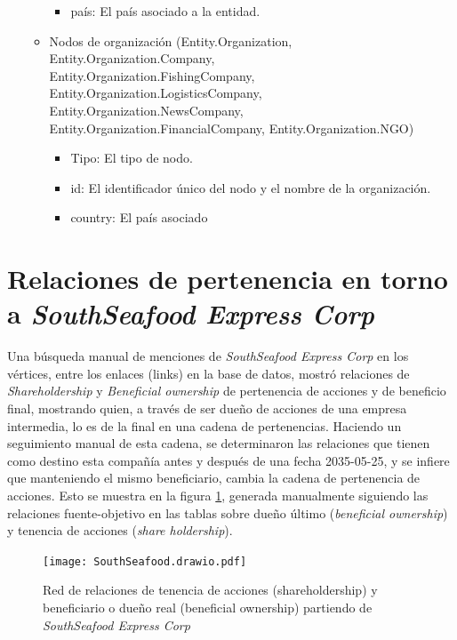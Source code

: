 \documentclass[11pt,spanish,a4paper]{article}
\begin{document}
\begin{itemize}
\begin{itemize}
\begin{itemize}
      \item país: El país asociado a la entidad. 
    \end{itemize}
    \item Nodos de organización (Entity.Organization, Entity.Organization.Company,\\
    Entity.Organization.FishingCompany, Entity.Organization.LogisticsCompany,\\
    Entity.Organization.NewsCompany, Entity.Organization.FinancialCompany, Entity.Organization.NGO)
    \begin{itemize}
      \item Tipo: El tipo de nodo.
      \item id: El identificador único del nodo y el nombre de la organización.
      \item  country: El país asociado
    \end{itemize}
  \end{itemize}
\end{itemize}


\section{Relaciones de pertenencia en torno a \emph{SouthSeafood Express Corp}}

Una búsqueda manual de menciones de \emph{SouthSeafood Express Corp} en los vértices, entre los enlaces (links) en la base de datos, mostró relaciones de \emph{Shareholdership} y \emph{Beneficial ownership} de pertenencia de acciones y de beneficio final, mostrando quien, a través de ser dueño de acciones de una empresa intermedia, lo es de la final en una cadena de pertenencias.
Haciendo un seguimiento manual de esta cadena, se determinaron las relaciones que tienen como destino esta compañía antes y después de una fecha 2035-05-25, y se infiere que manteniendo el mismo beneficiario, cambia la cadena de pertenencia de acciones.
Esto se muestra en la figura \ref{fig:drawio}, generada manualmente siguiendo las relaciones fuente-objetivo en las tablas sobre dueño último (\emph{beneficial ownership}) y tenencia de acciones (\emph{share holdership}).

\begin{figure}[!ht]
	\centering
	\texttt{[image: SouthSeafood.drawio.pdf]}
	\caption{Red de relaciones de tenencia de acciones (shareholdership) y  beneficiario o dueño real (beneficial ownership) partiendo de \emph{SouthSeafood Express Corp} }
	\label{fig:drawio}
\end{figure}
\end{document}

